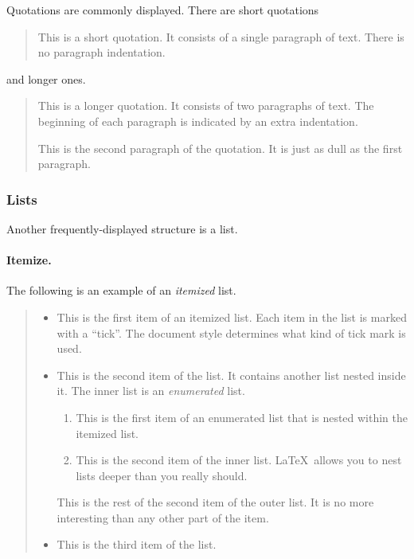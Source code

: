 Quotations are commonly displayed. There are short quotations
\begin{quote}
  This is a short quotation. It consists of a single paragraph of text. There
  is no paragraph indentation.
\end{quote}
and longer ones.
\begin{quotation}
  This is a longer quotation. It consists of two paragraphs of text. The
  beginning of each paragraph is indicated by an extra indentation.


  This is the second paragraph of the quotation. It is just as dull as the
  first paragraph.
\end{quotation}


\subsubsection{Lists}


Another frequently-displayed structure is a list.


\paragraph{Itemize.}
The following is an example of an {\em itemized} list.


\begin{quote}
  \begin{itemize}
    \item  This is the first item of an itemized list.  Each item
    in the list is marked with a ``tick''. The document style determines what
    kind of tick mark is used.


    \item  This is the second item of the list.  It contains another
    list nested inside it. The inner list is an {\em enumerated} list.
    \begin{enumerate}
      \item This is the first item of an enumerated list that
      is nested within the itemized list.


      \item This is the second item of the inner list.  \LaTeX\
      allows you to nest lists deeper than you really should.
    \end{enumerate}
    This is the rest of the second item of the outer list. It is no more
    interesting than any other part of the item.
    \item  This is the third item of the list.
  \end{itemize}
\end{quote}


